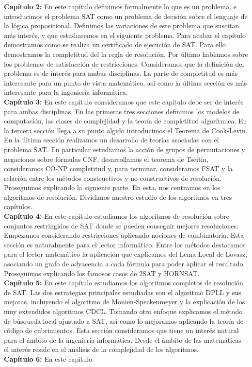 \textbf{Capítulo 2:} En este capítulo definimos formalmente lo que es un problema, e introducimos el problema SAT como un problema de decisión sobre el lenguaje de la lógica proposicional. Definimos las variaciones de este problema que suscitan más interés, y que estudiaremos en el siguiente problema. Para acabar el capítulo demostramos como se realiza un certificado de ejecución de SAT. Para ello demostramos la completitud del la regla de resolución. Por último hablamos sobre los problemas de satisfacción de restricciones. Consideramos que la definición del problema es de interés para ambas disciplinas. La parte de completitud es más interesante para un punto de vista matemático, así como la última sección es más interesante para la ingeniería informática.\\

\textbf{Capítulo 3:}  En este capítulo consideramos que este capítulo debe ser de interés para ambas disciplinas. En las primeras tres secciones definimos los modelos de computación, las clases de complejidad y la teoría de completitud algorítmica. En la tercera sección llega a su punto algido introducimos el Teorema de Cook-Levin.
En la última sección realizamos un desarrollo de teorías asociadas con el problema SAT. En particular estudiamos la acción de grupos de permutaciones y negaciones sobre fórmulas CNF, desarrollamos el teorema de Tseitin, consideramos CO-NP completitud y, para terminar, consideramos FSAT y la relación entre los métodos constructivos y no constructivos de resolución.\\


Proseguimos explicando la siguiente parte. En esta, nos centramos en los algoritmos de resolución. Dividimos nuestro estudio de los algoritmos en tres capítulos.\\


\textbf{Capítulo 4:} En este capítulo estudiamos los algoritmos de resolución sobre conjuntos restringidos de SAT donde se pueden conseguir mejores resoluciones. Empezamos considerando restricciones aplicando nociones de combinatoria. Esta sección es naturalmente para el lector informático. Entre los métodos destacamos para el lector matemático la aplicación que explicamos del Lema Local de Lovasz, asociando un grafo de adyacencia a cada fórmula para poder aplicar el resultado. Proseguimos explicando los famosos casos de 2SAT y HORNSAT. \\

\textbf{Capítulo 5:} En este capítulo estudiamos los algoritmos completos de resolución de SAT. Las dos estrategias principales estudiadas son el algoritmo DPLL y sus mejoras, incluyendo el algoritmo de Monien-Speckenmeyer y la explicación de los muy extendidos algoritmos CDCL. Tomando otro enfoque explicamos el método de búsqueda local ajustado a SAT, así como lo mejoramos aplicando la teoría de código de cubrimientos. Esta sección consideramos que tiene un interés natural para el ámbito de la ingeniería informática. Desde el ámbito de las matemáticas el interés reside en el análisis de la complejidad de los algoritmos.\\

\textbf{Capítulo 6:} En este capítulo 



\endinput
